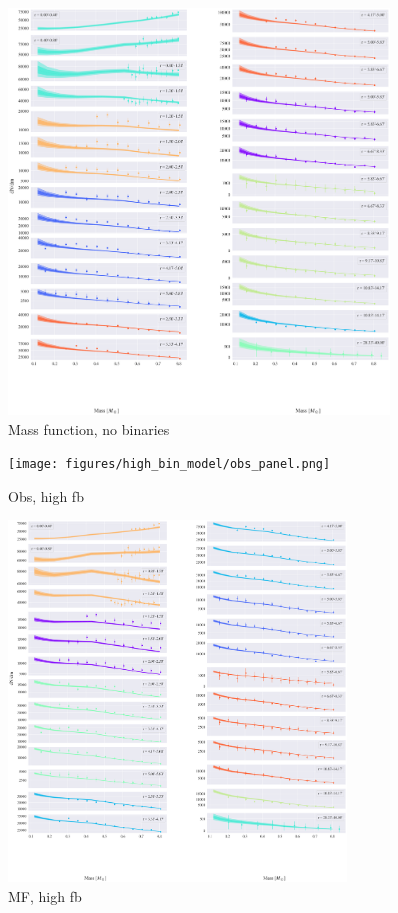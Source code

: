 \begin{figure}
	\begin{center}
		\includegraphics[width=0.9\textwidth]{figures/prev_nobin/mass_fun.png}
	\end{center}
	\caption{Mass function, no binaries}
	\label{fig:nobin_mass_fun}
\end{figure}

\begin{figure}
	\centering
	\texttt{[image: figures/high\_bin\_model/obs\_panel.png]}
	\caption{Obs, high fb}
	\label{fig:highbin_obs_panel}
\end{figure}


\begin{figure}
\centering
\includegraphics[width=0.8\textwidth]{figures/high_bin_model/mass_fun.png}
\caption{MF, high fb}
\label{fig:highbin_mass_fun}
\end{figure}